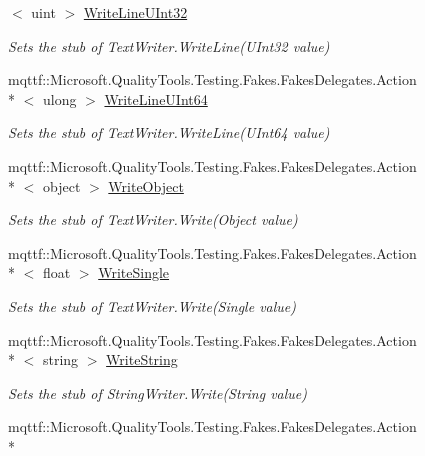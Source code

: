 \begin{DoxyCompactItemize}
$<$ uint $>$ \hyperlink{class_system_1_1_i_o_1_1_fakes_1_1_stub_string_writer_a3610bc2aa7347aff8495664a0f911cc3}{Write\-Line\-U\-Int32}
\begin{DoxyCompactList}\small\item\em Sets the stub of Text\-Writer.\-Write\-Line(\-U\-Int32 value)\end{DoxyCompactList}\item 
mqttf\-::\-Microsoft.\-Quality\-Tools.\-Testing.\-Fakes.\-Fakes\-Delegates.\-Action\\*
$<$ ulong $>$ \hyperlink{class_system_1_1_i_o_1_1_fakes_1_1_stub_string_writer_ad1536e8899b3f0e7a192cfa3ede55462}{Write\-Line\-U\-Int64}
\begin{DoxyCompactList}\small\item\em Sets the stub of Text\-Writer.\-Write\-Line(\-U\-Int64 value)\end{DoxyCompactList}\item 
mqttf\-::\-Microsoft.\-Quality\-Tools.\-Testing.\-Fakes.\-Fakes\-Delegates.\-Action\\*
$<$ object $>$ \hyperlink{class_system_1_1_i_o_1_1_fakes_1_1_stub_string_writer_a27c3393a75f1746571e0f4a415bf44cb}{Write\-Object}
\begin{DoxyCompactList}\small\item\em Sets the stub of Text\-Writer.\-Write(\-Object value)\end{DoxyCompactList}\item 
mqttf\-::\-Microsoft.\-Quality\-Tools.\-Testing.\-Fakes.\-Fakes\-Delegates.\-Action\\*
$<$ float $>$ \hyperlink{class_system_1_1_i_o_1_1_fakes_1_1_stub_string_writer_a0df8ca1893a960d25698711b4f0064f5}{Write\-Single}
\begin{DoxyCompactList}\small\item\em Sets the stub of Text\-Writer.\-Write(\-Single value)\end{DoxyCompactList}\item 
mqttf\-::\-Microsoft.\-Quality\-Tools.\-Testing.\-Fakes.\-Fakes\-Delegates.\-Action\\*
$<$ string $>$ \hyperlink{class_system_1_1_i_o_1_1_fakes_1_1_stub_string_writer_ae919b7df2009e920544ff0f8ffb12882}{Write\-String}
\begin{DoxyCompactList}\small\item\em Sets the stub of String\-Writer.\-Write(\-String value)\end{DoxyCompactList}\item 
mqttf\-::\-Microsoft.\-Quality\-Tools.\-Testing.\-Fakes.\-Fakes\-Delegates.\-Action\\*

\end{DoxyCompactItemize}
